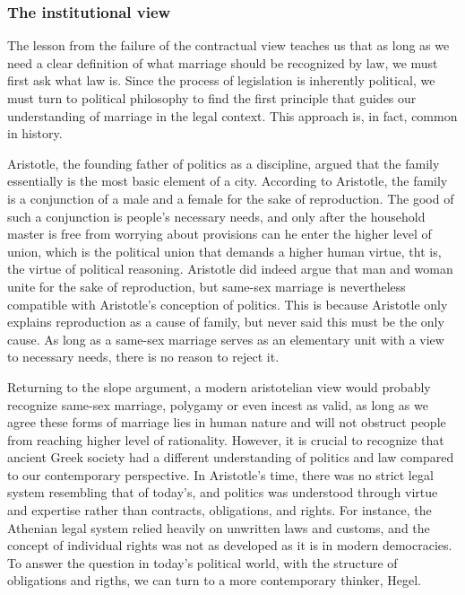 \documentclass{article}
\begin{document}
\subsubsection{The institutional view}

The lesson from the failure of the contractual view teaches us that as long as we need a clear definition of what marriage should be recognized by law, we must first ask what law is.  Since the process of legislation is inherently political, we must turn to political philosophy to find the first principle that guides our understanding of marriage in the legal context. This approach is, in fact, common in history.

Aristotle, the founding father of politics as a discipline, argued that the family essentially is the most basic element of a city. According to Aristotle, the family is a conjunction of a male and a female for the sake of reproduction. The good of such a conjunction is people's necessary needs, and only after the household master is free from worrying about provisions can he enter the higher level of union, which is the political union that demands a higher human virtue, tht is, the virtue of political reasoning. Aristotle did indeed argue that man and woman unite for the sake of reproduction, but same-sex marriage is nevertheless compatible with Aristotle's conception of politics. This is because Aristotle only explains reproduction as a cause of family, but never said this must be the only cause. As long as a same-sex marriage serves as an elementary unit with a view to necessary needs, there is no reason to reject it.\autocite{aristotePolitics1984}

Returning to the slope argument, a modern aristotelian view would probably recognize same-sex marriage, polygamy or even incest as valid, as long as we agree these forms of marriage lies in human nature and will not obstruct people from reaching higher level of rationality. However, it is crucial to recognize that ancient Greek society had a different understanding of politics and law compared to our contemporary perspective. In Aristotle's time, there was no strict legal system resembling that of today's, and politics was understood through virtue and expertise rather than contracts, obligations, and rights. For instance, the Athenian legal system relied heavily on unwritten laws and customs, and the concept of individual rights was not as developed as it is in modern democracies. To answer the question in today's political world, with the structure of obligations and rigths, we can turn to a more contemporary thinker, Hegel.
\end{document}

